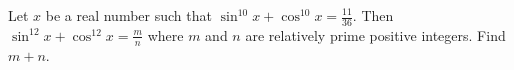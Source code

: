 Let $x$ be a real number such that $\sin^{10}x+\cos^{10} x = \tfrac{11}{36}$. Then $\sin^{12}x+\cos^{12} x = \tfrac{m}{n}$ where $m$ and $n$ are relatively prime positive integers. Find $m+n$.
